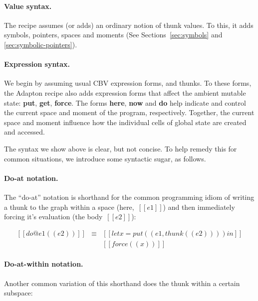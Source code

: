 \documentclass[11pt]{article}
\begin{document}
\paragraph{Value syntax.}
The recipe assumes (or adds) an ordinary notion of thunk values.
%
To this, it adds symbols, pointers, spaces and moments (See Sections~\ref{sec:symbols} and \ref{sec:symbolic-pointers}).

\ottgrammartabular{
  \ottv
}

\paragraph{Expression syntax.}

We begin by assuming usual CBV expression forms, and thunks.
%
To these forms, the Adapton recipe also adds expression forms that
affect the ambient mutable state: \textbf{put}, \textbf{get}, \textbf{force}.
%
The forms \textbf{here}, \textbf{now} and \textbf{do} help indicate
and control the current space and moment of the program, respectively.
%
Together, the current space and moment influence how the individual
cells of global state are created and accessed.

\ottgrammartabular{
  \otte
}

\ottgrammartabular{
  \ottC
  \\
  \ottCxtVerb
  \\
  \ottCxtDim
}  

\noindent
The syntax we show above is clear, but not concise.
%
To help remedy this for common situations, we introduce some syntactic sugar, as follows.

\paragraph{Do-at notation.}

The ``do-at'' notation is shorthand for the common programming idiom
of writing a thunk to the graph within a space (here,~$[[e1]]$) and then
immediately forcing it's evaluation (the body~$[[e2]]$):

\[
\begin{array}{lcl}
  [[do @e1 ({( e2 )}) ]]
  &\equiv&
  [[let x = put((e1, thunk((e2)))) in]]
  \\
  &&[[force((x))]]
\end{array}
\]

\paragraph{Do-at-within notation.}
Another common variation of this shorthand does the thunk within a
certain subspace:
\end{document}
